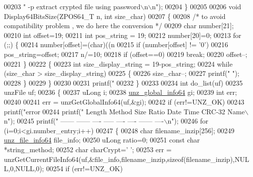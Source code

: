 \begin{DoxyCode}
{{00203            \textcolor{stringliteral}{"  -p  extract crypted file using password\(\backslash\)n\(\backslash\)n"});
00204 \}
00205 
00206 \textcolor{keywordtype}{void} Display64BitsSize(ZPOS64\_T n, \textcolor{keywordtype}{int} size\_char)
00207 \{
00208   \textcolor{comment}{/* to avoid compatibility problem , we do here the conversion */}
00209   \textcolor{keywordtype}{char} number[21];
00210   \textcolor{keywordtype}{int} offset=19;
00211   \textcolor{keywordtype}{int} pos\_string = 19;
00212   number[20]=0;
00213   \textcolor{keywordflow}{for} (;;) \{
00214       number[offset]=(char)((n%
00215       \textcolor{keywordflow}{if} (number[offset] != \textcolor{charliteral}{'0'})
00216           pos\_string=offset;
00217       n/=10;
00218       \textcolor{keywordflow}{if} (offset==0)
00219           \textcolor{keywordflow}{break};
00220       offset--;
00221   \}
00222   \{
00223       \textcolor{keywordtype}{int} size\_display\_string = 19-pos\_string;
00224       \textcolor{keywordflow}{while} (size\_char > size\_display\_string)
00225       \{
00226           size\_char--;
00227           printf(\textcolor{stringliteral}{" "});
00228       \}
00229   \}
00230 
00231   printf(\textcolor{stringliteral}{"%
00232 \}
00233 
00234 \textcolor{keywordtype}{int} do\_list(uf)
00235     unzFile uf;
00236 \{
00237     uLong i;
00238     \hyperlink{structunz__global__info64__s}{unz\_global\_info64} gi;
00239     \textcolor{keywordtype}{int} err;
00240 
00241     err = unzGetGlobalInfo64(uf,&gi);
00242     \textcolor{keywordflow}{if} (err!=UNZ\_OK)
00243         printf(\textcolor{stringliteral}{"error %
00244     printf(\textcolor{stringliteral}{"  Length  Method     Size Ratio   Date    Time   CRC-32     Name\(\backslash\)n"});
00245     printf(\textcolor{stringliteral}{"  ------  ------     ---- -----   ----    ----   ------     ----\(\backslash\)n"});
00246     \textcolor{keywordflow}{for} (i=0;i<gi.number\_entry;i++)
00247     \{
00248         \textcolor{keywordtype}{char} filename\_inzip[256];
00249         \hyperlink{structunz__file__info64__s}{unz\_file\_info64} file\_info;
00250         uLong ratio=0;
00251         \textcolor{keyword}{const} \textcolor{keywordtype}{char} *string\_method;
00252         \textcolor{keywordtype}{char} charCrypt=\textcolor{charliteral}{' '};
00253         err = unzGetCurrentFileInfo64(uf,&file\_info,filename\_inzip,\textcolor{keyword}{sizeof}(filename\_inzip),NULL,0,NULL,0);
00254         \textcolor{keywordflow}{if} (err!=UNZ\_OK)
}}}}
\end{DoxyCode}
